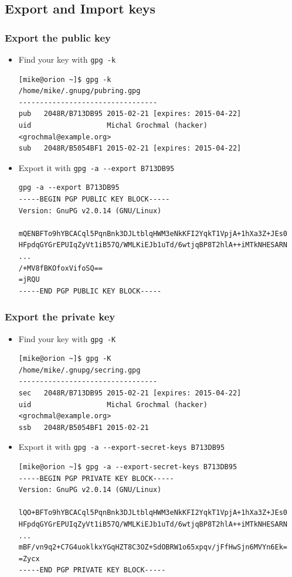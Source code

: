 \documentclass[hyperref={colorlinks=true}]{beamer}
\begin{document}
\subsection{Export and Import keys}
\begin{frame}[fragile]\frametitle{Export the public key}
  \begin{itemize}
    \item Find your key with \verb|gpg -k|
{\tiny
\begin{verbatim}
[mike@orion ~]$ gpg -k
/home/mike/.gnupg/pubring.gpg
---------------------------------
pub   2048R/B713DB95 2015-02-21 [expires: 2015-04-22]
uid                  Michal Grochmal (hacker) <grochmal@example.org>
sub   2048R/B5054BF1 2015-02-21 [expires: 2015-04-22]
\end{verbatim}
}
    \item Export it with \verb|gpg -a --export B713DB95|
{\tiny
\begin{verbatim}
gpg -a --export B713DB95
-----BEGIN PGP PUBLIC KEY BLOCK-----
Version: GnuPG v2.0.14 (GNU/Linux)

mQENBFTo9hYBCACql5PqnBnk3DJLtblqHWM3eNkKFI2YqkT1VpjA+1hXa3Z+JEs0
HFpdqGYGrEPUIqZyVt1iB57Q/WMLKiEJb1uTd/6wtjqBP8T2hlA++iMTkNHESARN
...
/+MV8fBKOfoxVifoSQ==
=jRQU
-----END PGP PUBLIC KEY BLOCK-----
\end{verbatim}
}
  \end{itemize}
\end{frame}

\begin{frame}[fragile]\frametitle{Export the private key}
  \begin{itemize}
    \item Find your key with \verb|gpg -K|
{\tiny
\begin{verbatim}
[mike@orion ~]$ gpg -K
/home/mike/.gnupg/secring.gpg
---------------------------------
sec   2048R/B713DB95 2015-02-21 [expires: 2015-04-22]
uid                  Michal Grochmal (hacker) <grochmal@example.org>
ssb   2048R/B5054BF1 2015-02-21
\end{verbatim}
}
    \item Export it with \verb|gpg -a --export-secret-keys B713DB95|
{\tiny
\begin{verbatim}
[mike@orion ~]$ gpg -a --export-secret-keys B713DB95
-----BEGIN PGP PRIVATE KEY BLOCK-----
Version: GnuPG v2.0.14 (GNU/Linux)

lQO+BFTo9hYBCACql5PqnBnk3DJLtblqHWM3eNkKFI2YqkT1VpjA+1hXa3Z+JEs0
HFpdqGYGrEPUIqZyVt1iB57Q/WMLKiEJb1uTd/6wtjqBP8T2hlA++iMTkNHESARN
...
mBF/vn9q2+C7G4uoklkxYGqHZT8C3OZ+SdOBRW1o65xpqv/jFfHwSjn6MVYn6Ek=
=Zycx
-----END PGP PRIVATE KEY BLOCK-----
\end{verbatim}
}
  \end{itemize}
\end{frame}
\end{document}
